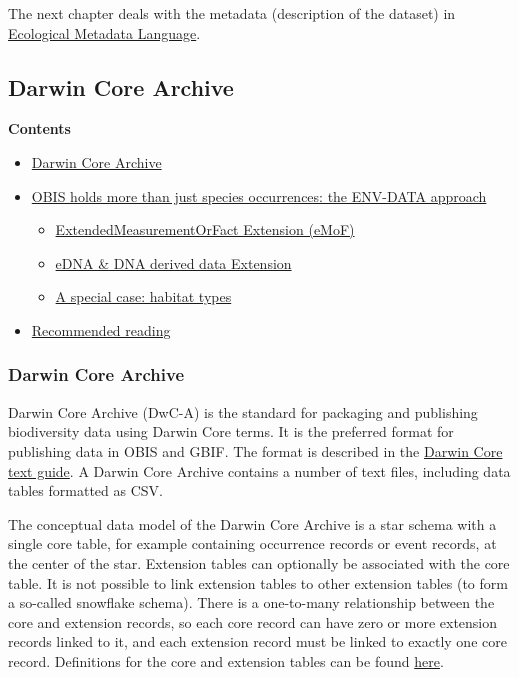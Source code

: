 \documentclass[
  letterpaper,
  DIV=11,
  numbers=noendperiod,
  oneside]{scrreprt}
\providecommand{\tightlist}{%
  \setlength{\itemsep}{0pt}\setlength{\parskip}{0pt}}\usepackage{longtable,booktabs,array}
\begin{document}
The next chapter deals with the metadata (description of the dataset) in
\href{eml.html}{Ecological Metadata Language}.

\hypertarget{darwin-core-archive}{%
\subsection{Darwin Core Archive}\label{darwin-core-archive}}

\textbf{Contents}

\begin{itemize}
\tightlist
\item
  \protect\hyperlink{darwin-core-archive}{Darwin Core Archive}
\item
  \protect\hyperlink{obis-holds-more-than-just-species-occurrences-the-env-data-approach}{OBIS
  holds more than just species occurrences: the ENV-DATA approach}

  \begin{itemize}
  \tightlist
  \item
    \protect\hyperlink{extendedmeasurementorfact-extension-emof}{ExtendedMeasurementOrFact
    Extension (eMoF)}
  \item
    \protect\hyperlink{edna-dna-derived-data-extension}{eDNA \& DNA
    derived data Extension}
  \item
    \protect\hyperlink{a-special-case-habitat-types}{A special case:
    habitat types}
  \end{itemize}
\item
  \protect\hyperlink{recommended-reading}{Recommended reading}
\end{itemize}

\hypertarget{darwin-core-archive-1}{%
\subsubsection{Darwin Core Archive}\label{darwin-core-archive-1}}

Darwin Core Archive (DwC-A) is the standard for packaging and publishing
biodiversity data using Darwin Core terms. It is the preferred format
for publishing data in OBIS and GBIF. The format is described in the
\href{https://dwc.tdwg.org/text/}{Darwin Core text guide}. A Darwin Core
Archive contains a number of text files, including data tables formatted
as CSV.

The conceptual data model of the Darwin Core Archive is a star schema
with a single core table, for example containing occurrence records or
event records, at the center of the star. Extension tables can
optionally be associated with the core table. It is not possible to link
extension tables to other extension tables (to form a so-called
snowflake schema). There is a one-to-many relationship between the core
and extension records, so each core record can have zero or more
extension records linked to it, and each extension record must be linked
to exactly one core record. Definitions for the core and extension
tables can be found \href{http://rs.gbif.org/}{here}.
\end{document}
